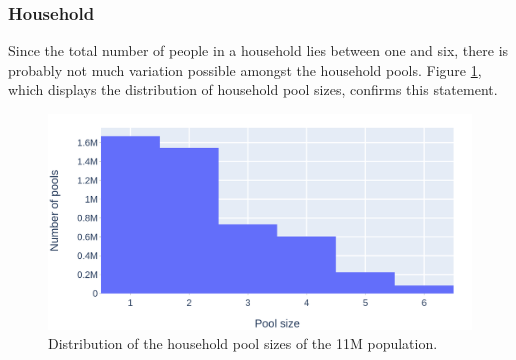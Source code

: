 \begin{table}
\centering
{}
\caption{General statistics of the contact pools of the 11M population.}
\label{tab:contact_pools_statistics}
\end{table}

\subsubsection{Household}
Since the total number of people in a household lies between one and six, there is probably not much variation possible amongst the household pools. Figure \ref{fig:household_poolsize_distribution}, which displays the distribution of household pool sizes, confirms this statement. 

\begin{figure}
    \centering
    \includegraphics[width=.8\textwidth]{3 - Stride/fig/household_poolsizes.png}
    \caption{Distribution of the household pool sizes of the 11M population.}
    \label{fig:household_poolsize_distribution}
\end{figure}

